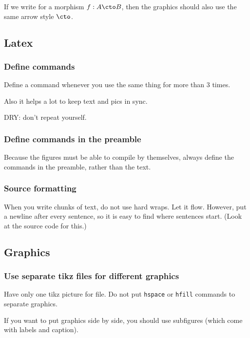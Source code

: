 If we write for a morphism $f: A \cto B$, then the graphics should also use the
same arrow style $\cto$.


\subsection*{Latex}

\subsubsection*{Define commands }

Define a command whenever you use the same thing for more than 3 times.

Also it helps a lot to keep text and pics in sync.

DRY: don't repeat yourself.



\subsubsection*{Define commands in the preamble }

Because the figures must be able to compile by themselves, always define the commands in the preamble, rather than the text.



\subsubsection*{Source formatting}

When you write chunks of text, do not use hard wraps. %
Let it flow. %
However, put a newline after every sentence, so it is easy to find where sentences start.
(Look at the source code for this.)


\subsection*{Graphics}

\subsubsection*{Use separate tikz files for different graphics}

Have only one tikz picture for file. Do not put \texttt{hspace} or \texttt{hfill} commands to separate graphics.


If you want to put graphics side by side, you should use subfigures (which come with labels and caption).


